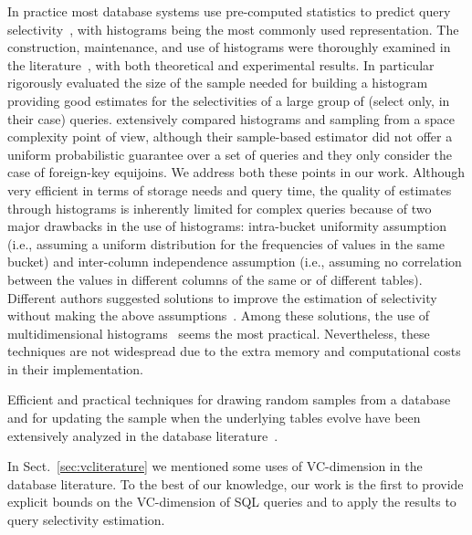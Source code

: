 In practice most database systems use pre-computed statistics to predict query
selectivity~\citep{HouOT88,GibbonsM98,GantiLR00,JinGJA06,LarsonLZZ07}, with
histograms being the most commonly used representation. The construction,
maintenance, and use of histograms were thoroughly examined in the
literature~\citep{JagadishKMPSS98,IoannidisP95,MatiasVW98,PoosalaHIS96}, with
both theoretical and experimental results. In particular~\citet{ChaudhuriMN98}
rigorously evaluated the size of the sample needed for building a histogram
providing good estimates for the selectivities of a large group of (select only,
in their case) queries. \citet{KaushikNRC05} extensively compared histograms
and sampling from a space complexity point of view, although their sample-based
estimator did not offer a uniform probabilistic guarantee over a set of queries
and they only consider the case of foreign-key equijoins. We address both these
points in our work. Although very efficient in terms of storage needs and query
time, the quality of estimates through histograms is inherently limited for
complex queries because of two major drawbacks in the use of histograms:
intra-bucket uniformity assumption (i.e., assuming a uniform distribution for
the frequencies of values in the same bucket) and inter-column independence
assumption (i.e., assuming no correlation between the values in different
columns of the same or of different tables). Different authors suggested
solutions to improve the estimation of selectivity without making the above
assumptions~\citep{BrunoC04,Dobra05,PoosalaI97,WangVI97,WangS03}. Among these
solutions, the use of multidimensional
histograms~\citep{BrunoCG01,PoosalaI97,SrivastavaHMKT,WangS03} seems the most
practical. Nevertheless, these techniques are not widespread due to the extra
memory and computational costs in their implementation.  

Efficient and practical techniques for drawing random samples from a database
and for updating  the sample when the underlying tables evolve have been
extensively analyzed in the database
literature~\citep{BrownH06,GemullaLH06,GemullaLH07,HaasK04,JermainePA04}.

In Sect.~\ref{sec:vcliterature} we mentioned some uses of VC-dimension in the
database literature. To the best of our knowledge, our work is the first to
provide explicit bounds on the VC-dimension of SQL queries and to apply the
results to query selectivity estimation.


